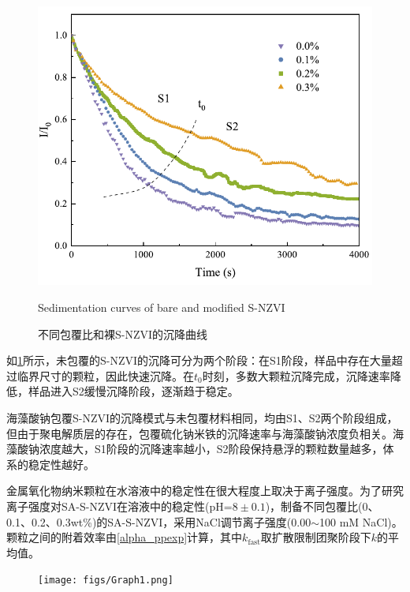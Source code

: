 \begin{figure}[h]
    \centering
    \includegraphics[width=12cm]{figs/fig1.pdf}
    \caption{不同包覆比和裸S-NZVI的沉降曲线}{Sedimentation curves of bare and modified S-NZVI}\label{fig01}
\end{figure}

如\cref{fig01}所示，未包覆的S-NZVI的沉降可分为两个阶段：在S1阶段，样品中存在大量超过临界尺寸的颗粒，因此快速沉降。在$t_0$时刻，多数大颗粒沉降完成，沉降速率降低，样品进入S2缓慢沉降阶段，逐渐趋于稳定。

海藻酸钠包覆S-NZVI的沉降模式与未包覆材料相同，均由S1、S2两个阶段组成，但由于聚电解质层的存在，包覆硫化钠米铁的沉降速率与海藻酸钠浓度负相关。海藻酸钠浓度越大，S1阶段的沉降速率越小，S2阶段保持悬浮的颗粒数量越多，体系的稳定性越好。


金属氧化物纳米颗粒在水溶液中的稳定性在很大程度上取决于离子强度。为了研究离子强度对SA-S-NZVI在溶液中的稳定性(pH=$8\pm 0.1$)，制备不同包覆比(0、0.1、0.2、0.3wt\%)的SA-S-NZVI，采用NaCl调节离子强度(0.00$\sim$100 mM NaCl)。颗粒之间的附着效率由\cref{alpha_ppexp}计算，其中$k_{\mathrm{fast}}$取扩散限制团聚阶段下$k$的平均值。

\begin{figure}[h]
    \centering
   \texttt{[image: figs/Graph1.png]}
    \label{fig4}
\end{figure}

